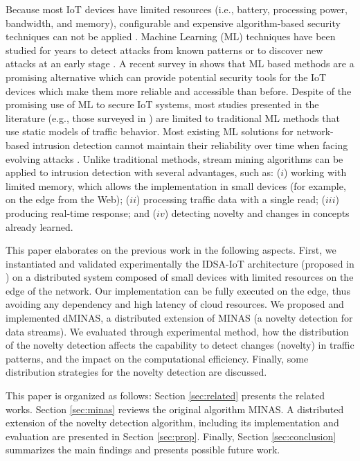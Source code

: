 Because most IoT devices have limited resources (i.e., battery, processing
power, bandwidth, and memory), configurable and expensive algorithm-based
security techniques can not be applied \cite{Zhou2017}.
Machine Learning (ML) techniques have been studied for years to detect attacks
from known patterns or to discover new attacks at an early stage
\cite{buczak2016survey,mitchell2014survey}.
A recent survey in \cite{Tahsien2020} shows that ML based methods are a
promising alternative which can provide potential security tools for the IoT
devices which make them more reliable and accessible than before.
Despite of the promising use of ML to secure IoT systems, most studies presented
in the literature (e.g., those surveyed in
\cite{buczak2016survey,mitchell2014survey,Tahsien2020}) are limited to
traditional ML methods that use static models of traffic behavior.
Most existing ML solutions for network-based intrusion detection cannot maintain
their reliability over time when facing evolving attacks \cite{Viegas2019}.
Unlike traditional methods, stream mining algorithms can be applied to intrusion
detection with several advantages, such as: ($ i $) working with limited memory,
which allows the implementation in small devices (for example, on the edge from
the Web); ($ ii $) processing traffic data with a single read; ($ iii $)
producing real-time response; and ($ iv $) detecting novelty and changes in
concepts already learned.

{\color{red} This paper elaborates on the previous work in the following
aspects. First, we instantiated and validated experimentally the IDSA-IoT
architecture (proposed in \cite{Cassales2019a} ) on a distributed system
composed of small devices with limited resources on the edge of the network. Our
implementation can be fully executed on the edge, thus avoiding any dependency
and high latency of cloud resources. We proposed and implemented dMINAS, a
distributed extension of MINAS \cite{Faria2016minas} (a novelty detection for
data streams). We evaluated through experimental method, how the distribution of
the novelty detection affects the capability to detect changes (novelty) in
traffic patterns, and the impact on the computational efficiency. Finally, some
distribution strategies for the novelty detection are discussed. }

This paper  is organized as follows:
Section \ref{sec:related} presents the related works.
Section \ref{sec:minas} reviews the original algorithm MINAS.
A distributed extension of the novelty detection algorithm, including its
implementation and evaluation are presented in Section \ref{sec:prop}.
Finally, Section \ref{sec:conclusion} summarizes the main findings and presents
possible future work.

